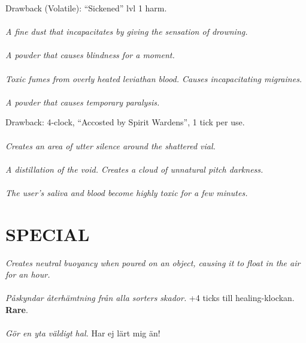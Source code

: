 \documentclass{article}
\begin{document}
\begin{multicols*}{3}
Drawback (Volatile): ``Sickened'' lvl 1 harm.
\\\\
\textit{A fine dust that incapacitates by giving the sensation of drowning.}
\\\\
\textit{A powder that causes blindness for a moment.}
\\\\
\textit{Toxic fumes from overly heated leviathan blood.
Causes incapacitating migraines.}
\\\\
\textit{A powder that causes temporary paralysis.}


Drawback: 4-clock, ``Accosted by Spirit Wardens'', 1 tick per use.
\\\\
\textit{Creates an area of utter silence around the shattered vial.}
\HasAmount
\\\\
\textit{A distillation of the void.
Creates a cloud of unnatural pitch darkness.}
\HasAmount
\\\\
\textit{The user's saliva and blood become highly toxic for a few minutes.}
\HasAmount


\section*{\uppercase{Special}}
\textit{Creates neutral buoyancy when poured on an object, causing it to float in the air for an hour.}
\\\\
\textit{Påskyndar återhämtning från alla sorters skador.}
+4 ticks till healing-klockan.
\textbf{Rare}.
\HasAmountRare
\\\\
\textit{Gör en yta väldigt hal.}
Har ej lärt mig än!



\end{multicols*}
\end{document}
